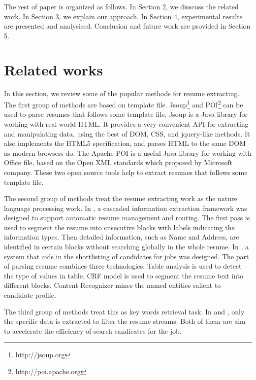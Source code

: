 \documentclass{acm_proc_article-sp}
\begin{document}

The rest of paper is organized as follows. In Section 2, we disscuss the related work. In Section 3, we explain our approach. In Section 4, experimental results are presented and analysised. Conclusion and future work are provided in Section 5.

\section{Related works}

In this section, we review some of the popular methods for resume extracting.
The first group of methods are based  on template file.
Jsoup\footnote{http://jsoup.org} and POI\footnote{http://poi.apache.org} can be used to parse resumes that follows some template file.
Jsoup is a Java library for working with real-world HTML. 
It provides a very convenient API for extracting and manipulating data, using the best of DOM, CSS, and jquery-like methods.
It also implements the HTML5 specification, and parses HTML to the same DOM as modern browsers do.
The Apache POI is a useful Java library for working with Office file, based on the Open XML standards which proposed by Microsoft company.
These two open source tools help to extract resumes that follows some template file.

The second group of methods treat the resume extracting work as the nature language processing work. 
In \cite{Yu:2005:RIE:1219840.1219902}, a cascaded information extraction framework was designed to support automatic resume management and routing.
The first pass is used to segment the resume into cnsecutive blocks with labels indicating the information types. 
Then detailed information, such as Name and Address, are identified in certain blocks without searching globally in the whole resume.
In \cite{Singh:2010:PSS:1871437.1871523}, a system that aids in the shortlisting of candidates for jobs was designed. 
The part of parsing resume combines three technologies. 
Table analysis is used to detect the type of values in table. 
CRF model is used to segment the resume text into different blocks. 
Content Recognizer mines the named entities salient to candidate profile.

The third group of methods treat this as key words retrieval task.
In \cite{kopparapu2010automatic} and \cite{maheshwari2010approach}, only the specific data is extracted to filter the resume streams. 
Both of them are aim to accelerate the efficiency of search candicates for the job.
\end{document}
